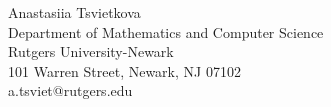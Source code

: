 \documentclass[12pt]{amsart}
\theoremstyle{definition}
\theoremstyle{remark}
\begin{document}
Anastasiia Tsvietkova\\
Department of Mathematics and Computer Science\\
Rutgers University-Newark \\
101 Warren Street, Newark, NJ  07102\\
a.tsviet@rutgers.edu

%

%
\end{document}
